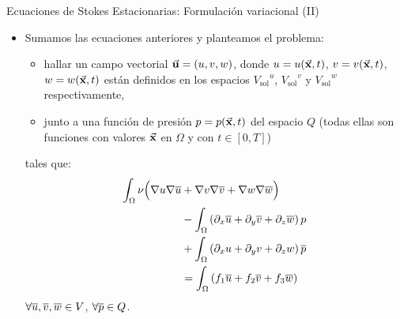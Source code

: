 \documentclass[9pt, dvipsnames,]{beamer}
\newcommand{\Vtest}{\ensuremath{V}}
\newcommand{\Vsol}{\ensuremath{V_{\text{sol}}}}
\newcommand{\VsolU}{\ensuremath{\Vsol^u}}
\newcommand{\VsolV}{\ensuremath{\Vsol^v}}
\newcommand{\VsolW}{\ensuremath{\Vsol^w}}
\begin{document}
\begin{frame}{Ecuaciones de Stokes Estacionarias: Formulación variacional (II)}
  \begin{itemize}
  \item Sumamos las ecuaciones anteriores y planteamos el problema:
    \begin{itemize}
    \item hallar un campo vectorial $\vec{\mathbf{u}}=(u,v,w)$, donde $u=u(\vec{\mathbf{x}},t)$,
    $v=v(\vec{\mathbf{x}},t)$, $w=w(\vec{\mathbf{x}},t)$ están definidos en los espacios $\VsolU$, $\VsolV$ y $\VsolW$ respectivamente,
  \item junto a una función de presión $p=p(\vec{\mathbf{x}},t)$ del espacio $Q$ 
    (todas ellas son funciones con valores $\vec{\mathbf{x}}$ en $\Omega$ y con $t\in [0,T]$)
  \end{itemize}
  tales que:
    \begin{align*}
      \int_\Omega \nu\Big( \nabla u\nabla \overline u &+
      \nabla v\nabla \overline v + \nabla w\nabla \overline w \Big)
      \\
      &- \int_\Omega \left( \partial_x \overline u + \partial_y \overline v + \partial_z \overline w \right) p
      \\
      &+ \int_\Omega \left( \partial_x u + \partial_y v + \partial_z w \right) \overline {p}
      \\
      &= \int_\Omega \left( f_1 \overline u + f_2 \overline v + f_3 \overline w \right)
    \end{align*}
    $\forall \bu,\bv, \bw\in \Vtest$, $\forall\overline {p}\in Q$.
  \end{itemize}

\end{frame}
\end{document}
